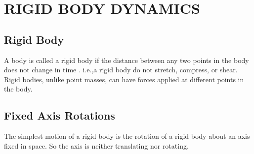 \chapter{RIGID BODY DYNAMICS}
\section{Rigid Body}
A body is called a rigid body if the distance between any two points in the body does  not  change  in  time . i.e.,a rigid body  do  not  stretch, compress, or shear. Rigid  bodies,  unlike  point  masses,  can  have  forces  applied  at different points in the body.
\section{Fixed Axis Rotations}
The simplest motion of a rigid body  is the rotation of a rigid body about an axis fixed in space. So the axis is neither translating nor rotating.

